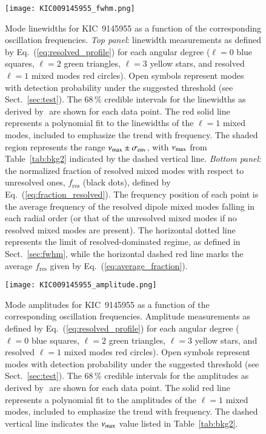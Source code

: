 \begin{figure}
   \centering
   \texttt{[image: KIC009145955\_fwhm.png]}
      \caption{Mode linewidths for KIC~9145955 as a function of the corresponding oscillation frequencies. \textit{Top panel}: linewidth measurements as defined by Eq.~(\ref{eq:resolved_profile}) for each angular degree ($\ell = 0$ blue squares, $\ell = 2$ green triangles, $\ell = 3$ yellow stars, and resolved $\ell = 1$ mixed modes red circles). Open symbols represent modes with detection probability under the suggested threshold (see Sect.~\ref{sec:test}). The 68\,\% credible intervals for the linewidths as derived by \diamonds\,\,are shown for each data point. The red solid line represents a polynomial fit to the linewidths of the $\ell = 1$ mixed modes, included to emphasize the trend with frequency. The shaded region represents the range $\nu_\mathrm{max} \pm \sigma_\mathrm{env}$, with $\nu_\mathrm{max}$ from Table~\ref{tab:bkg2} indicated by the dashed vertical line. \textit{Bottom panel}: the normalized fraction of resolved mixed modes with respect to unresolved ones, $f_\mathrm{res}$ (black dots), defined by Eq.~(\ref{eq:fraction_resolved}). The frequency position of each point is the average frequency of the resolved dipole mixed modes falling in each radial order (or that of the unresolved mixed modes if no resolved mixed modes are present). The horizontal dotted line represents the limit of resolved-dominated regime, as defined in Sect.~\ref{sec:fwhm}, while the horizontal dashed red line marks the average $f_\mathrm{res}$ given by Eq.~(\ref{eq:average_fraction}).}
    \label{fig:9145955fwhm}
\end{figure}

\begin{figure}
   \centering
   \texttt{[image: KIC009145955\_amplitude.png]}
      \caption{Mode amplitudes for KIC~9145955 as a function of the corresponding oscillation frequencies. Amplitude measurements as defined by Eq.~(\ref{eq:resolved_profile}) for each angular degree ($\ell = 0$ blue squares, $\ell = 2$ green triangles, $\ell = 3$ yellow stars, and resolved $\ell = 1$ mixed modes red circles). Open symbols represent modes with detection probability under the suggested threshold (see Sect.~\ref{sec:test}). The 68\,\% credible intervals for the amplitudes as derived by \diamonds\,\,are shown for each data point. The solid red line represents a polynomial fit to the amplitudes of the $\ell = 1$ mixed modes, included to emphasize the trend with frequency. The dashed vertical line indicates the $\nu_\mathrm{max}$ value listed in Table~\ref{tab:bkg2}.}
    \label{fig:9145955amplitude}
\end{figure}
\clearpage


